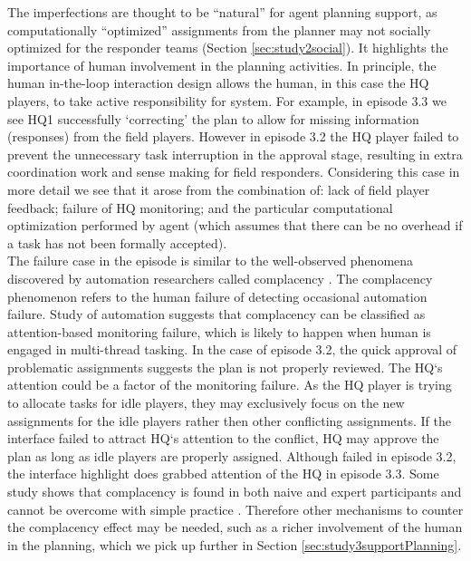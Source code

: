 The imperfections are thought to be ``natural'' for agent planning support, as computationally ``optimized'' assignments from the planner may not socially optimized for the responder teams (Section \ref{sec:study2social}). It highlights the importance of human involvement in the planning activities. In principle, the human in-the-loop interaction design allows the human, in this case the HQ players, to take active responsibility for system. For example, in episode 3.3 we see HQ1 successfully `correcting' the plan to allow for missing information (responses) from the field players. However in episode 3.2 the HQ player failed to prevent the unnecessary task interruption in the approval stage, resulting in extra coordination work and sense making for field responders. Considering this case in more detail we see that it arose from the combination of: lack of field player feedback; failure of HQ monitoring; and the particular computational optimization performed by agent (which assumes that there can be no overhead if a task has not been formally accepted).\\

The failure case in the episode is similar to the well-observed phenomena discovered by automation researchers called complacency \cite{Kaber1997}. The complacency phenomenon refers to the human failure of detecting occasional automation failure. Study of automation suggests that complacency can be classified as attention-based monitoring failure, which is likely to happen when human is engaged in multi-thread tasking. In the case of episode 3.2, the quick approval of problematic assignments suggests the plan is not properly reviewed. The HQ`s attention could be a factor of the monitoring failure. As the HQ player is trying to allocate tasks for idle players, they may exclusively focus on the new assignments for the idle players rather then other conflicting assignments.  If the interface failed to attract HQ`s attention to the conflict, HQ may approve the plan as long as idle players are properly assigned. Although failed in episode 3.2, the interface highlight does grabbed attention of the HQ in episode 3.3. Some study shows that complacency is found in both naive and expert participants and cannot be overcome with simple practice \cite{Parasuraman2010}. Therefore other mechanisms to counter the complacency effect may be needed, such as a richer involvement of the human in the planning, which we pick up further in Section \ref{sec:study3supportPlanning}.\\

